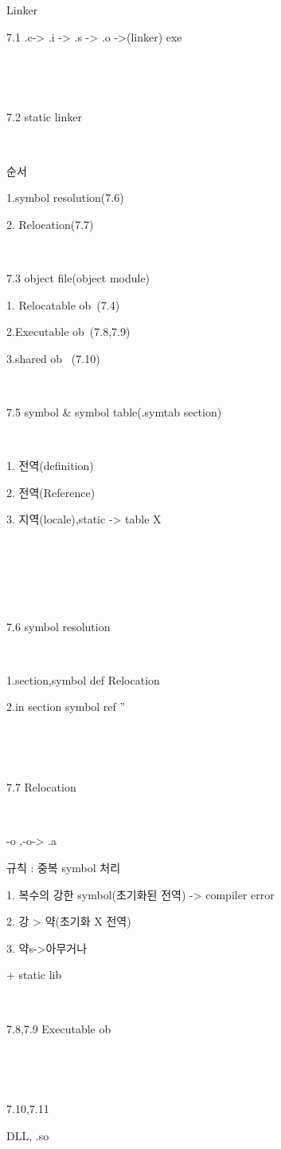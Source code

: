 Linker

7.1 .c-> .i -> .s -> .o ->(linker) exe

​

​

7.2 static linker

​

순서

1.symbol resolution(7.6)

2. Relocation(7.7)

​

7.3 object file(object module)

1. Relocatable ob~(7.4)

2.Executable ob~(7.8,7.9)

3.shared ob~ (7.10)

​

7.5 symbol \& symbol table(.symtab section)

​

1. 전역(definition)

2. 전역(Reference)

3. 지역(locale),static -> table X

​

​

​

7.6 symbol resolution

​

1.section,symbol def Relocation

2.in section symbol ref ''

​

​

7.7 Relocation

​

-o ,-o-> .a

규칙 : 중복 symbol 처리

1. 복수의 강한 symbol(초기화된 전역) -> compiler error

2. 강 > 약(초기화 X 전역)

3. 약s->아무거나

+ static lib

​

7.8,7.9 Executable ob~

​

​

7.10,7.11

DLL, .so 

